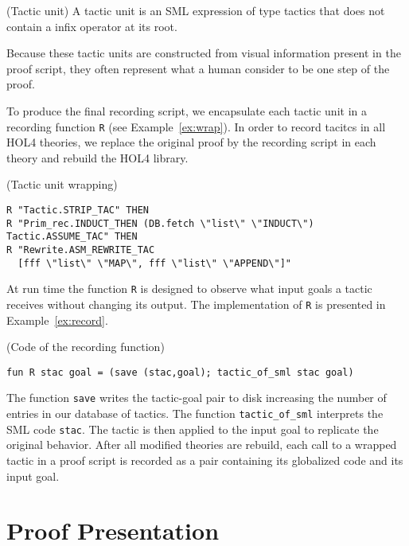 \documentclass[runningheads,a4paper,draft]{svjour3}
\def\holfour{\textsf{HOL4}\xspace}
\def\sml{\textsf{SML}\xspace}
\begin{document}
\begin{definition}(Tactic unit)
A tactic unit is an \sml expression of type tactics that does not contain a
infix operator at its root.
\end{definition}

Because these tactic units are constructed from visual information present in
the proof script, they often represent what a human consider to be one step of
the proof.

To produce the final recording script, we encapsulate each tactic unit
in a recording function \texttt{R} (see Example~\ref{ex:wrap}). In order to
record
tacitcs in all \holfour theories, we replace the original proof by the
recording script in each theory and rebuild the \holfour library.

\begin{example}\label{ex:wrap} (Tactic unit wrapping)
\begin{lstlisting}[language=SMLSmall]
R "Tactic.STRIP_TAC" THEN
R "Prim_rec.INDUCT_THEN (DB.fetch \"list\" \"INDUCT\") Tactic.ASSUME_TAC" THEN
R "Rewrite.ASM_REWRITE_TAC
  [fff \"list\" \"MAP\", fff \"list\" \"APPEND\"]"
\end{lstlisting}
\end{example}

At run time the function \texttt{R} is designed to observe what input goals a
tactic  receives without changing its output. The implementation of \texttt{R}
is presented in Example~\ref{ex:record}.

\begin{example}\label{ex:record} (Code of the recording function)
\begin{lstlisting}[language=SMLSmall]
fun R stac goal = (save (stac,goal); tactic_of_sml stac goal)
\end{lstlisting}
\end{example}

The function \texttt{save} writes the tactic-goal pair to disk increasing the
number of entries in our database of tactics. The function
\texttt{tactic\_of\_sml} interprets the \sml code \texttt{stac}. The tactic is
then applied to the input goal to replicate the original behavior.
After all modified theories are rebuild, each call to a wrapped tactic in a
proof script is recorded as a pair containing its globalized code and its
input goal.



\section{Proof Presentation}\label{sec:proofdisplay}
\end{document}
